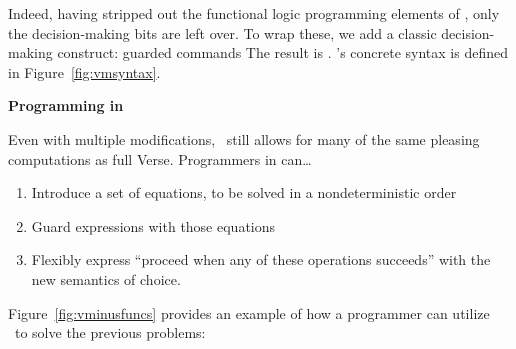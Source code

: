 \documentclass[article,screen,12pt, nonacm]{acmart}
\begin{document}
        
        
        


        Indeed, having stripped out the functional logic programming elements of
        \VC, only the decision-making bits are left over. To wrap these, we add
        a classic decision-making construct: guarded commands\cite{dijkstra} The
        result is \VMinus. \VMinus's concrete syntax is defined in
        Figure~\ref{fig:vmsyntax}. 

        

    \bf{Programming in \VMinus}
        
    Even with multiple modifications, \VMinus\ still allows for many of the same
    pleasing computations as full Verse. Programmers in \VMinus can\dots
        \begin{enumerate}
            \item Introduce a set of equations, to be solved in a
            nondeterministic order 
            \item Guard expressions with those equations 
            \item Flexibly express “proceed when any of these operations
            succeeds” with the new semantics of choice.  
        \end{enumerate}

    Figure~\ref{fig:vminusfuncs} provides an example of how a programmer can
    utilize \VMinus\ to solve the previous problems: 
    
\end{document}
